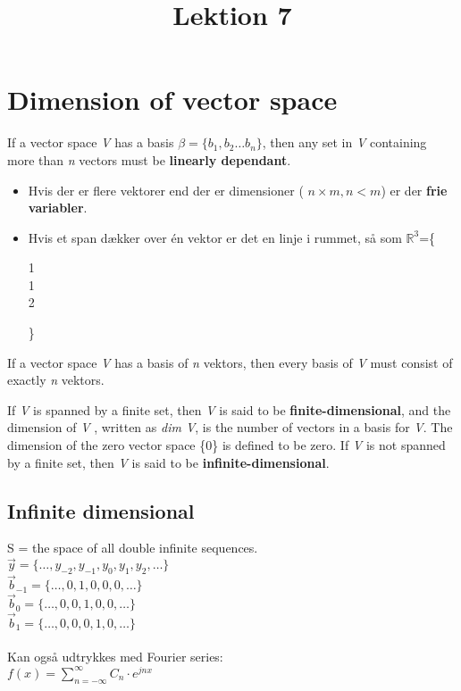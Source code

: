 \documentclass[english, danish]{article}
\title{Lektion 7}
\begin{document}
\maketitle

\section*{Dimension of vector space}
\begin{theo}[Theorem 7] 
If a vector space \textit{V} has a basis $\beta=\{b_1, b_2 \dots b_n\}$, then any set in \textit{V} containing more than \textit{n} vectors must be \textbf{linearly dependant}.
\end{theo}

\begin{theo} 
\begin{itemize}
\item Hvis der er flere vektorer end der er dimensioner ( $n \times m, n<m$) er der \textbf{frie variabler}.

\item Hvis et span dækker over én vektor er det en linje i rummet, så som $\mathbb{R}^3$=\{
\begin{ArgMat}
1\\
1\\
2
\end{ArgMat}\}
\end{itemize}\end{theo}



\begin{theo}[Theorem 10] 
If a vector space \textit{V} has a basis of \textit{n} vektors, then every basis of \textit{V} must consist of exactly \textit{n} vektors.
\end{theo}


\begin{theo}[Defination] 
If \textit{V} is spanned by a finite set, then \textit{V} is said to be \textbf{finite-dimensional}, and the dimension of \textit{V} , written as \textit{dim V}, is the number of vectors in a basis for \textit{V}. 
The dimension of the zero vector space \{0\} is defined to be zero. 
If \textit{V} is not spanned by a finite set, then \textit{V} is said to be \textbf{infinite-dimensional}.
\end{theo}

\subsection*{Infinite dimensional}
S = the space of all double infinite sequences.\\
$\vec{y} = \{ \dots, y_{-2}, y_{-1}, y_0, y_1, y_2, \dots\}$\\
$\vec{b}_{-1} = \{ \dots, 0, 1, 0, 0, 0, \dots\}$\\
$\vec{b}_{0} = \{ \dots, 0, 0, 1, 0, 0, \dots\}$\\
$\vec{b}_{1} = \{ \dots, 0, 0, 0, 1, 0, \dots\}$
\\
\\
Kan også udtrykkes med Fourier series:\\
$f(x) = \sum \limits_{n=-\infty}^\infty C_n \cdot e^{jnx}$
\end{document}
